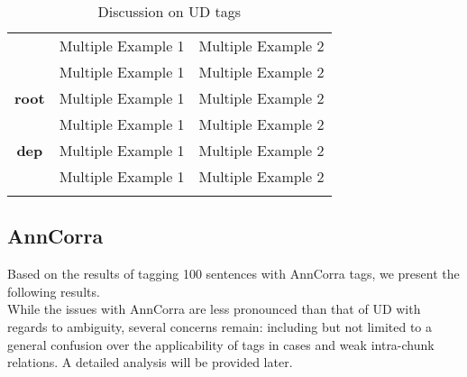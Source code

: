 \documentclass[a4 paper]{article}
\begin{document}
\begin{longtable}{cp{}p{}}
                 & Multiple Example 1 & Multiple Example 2\\
    \addlinespace[0.5em]
                 & Multiple Example 1 & Multiple Example 2\\
    \midrule
    \textbf{root}
                 & Multiple Example 1 & Multiple Example 2\\
    \addlinespace[0.5em]
                 & Multiple Example 1 & Multiple Example 2\\
    \midrule
    \textbf{dep}
                 & Multiple Example 1 & Multiple Example 2\\
    \addlinespace[0.5em]
                 & Multiple Example 1 & Multiple Example 2\\
    \bottomrule
    
\caption{Discussion on UD tags}
\label{tab:udtable}
\end{longtable}

\subsection{AnnCorra}
Based on the results of tagging 100 sentences with AnnCorra tags, we present the
following results.\\
While the issues with AnnCorra are less pronounced than that of UD with regards
to ambiguity, several concerns remain: including but not limited to a general
confusion over the applicability of tags in cases and weak intra-chunk
relations. A detailed analysis will be provided later.
\end{document}
